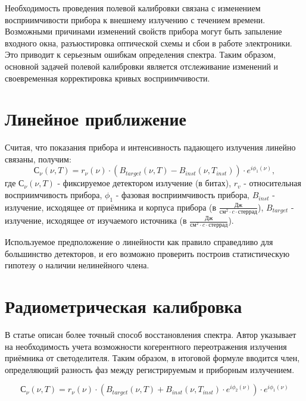 \documentclass{mipt-thesis-bs}
\begin{document}
 Необходимость проведения полевой калибровки связана с изменением восприимчивости прибора к внешнему излучению с течением времени. Возможными причинами изменений свойств прибора могут быть запыление входного окна, разъюстировка оптической схемы и сбои в работе электроники. Это приводит к серьезным ошибкам определения спектра. Таким образом, основной задачей полевой калибровки является отслеживание изменений и своевременная корректировка кривых восприимчивости.
	
	\section{Линейное приближение}
	
	Считая, что показания прибора и интенсивность падающего излучения линейно связаны, получим:
		\begin{equation}
С_\nu(\nu,T)=r_\nu(\nu)\cdot\left(B_{target}(\nu,T)-B_{inst}(\nu,T_{inst})\right) \cdot e^{i\phi_1(\nu)}, 	
	\end{equation}
где $С_\nu(\nu,T)$ - фиксируемое детектором излучение (в битах), $r_v$  - относительная восприимчивость прибора, $\phi_1$ - фазовая восприимчивость прибора, $B_{inst}$   - излучение, исходящее от приёмника и корпуса прибора (в $\frac{Дж}{см^2 \cdot c \cdot стеррад}$), $B_{target}$  - излучение, исходящее от изучаемого источника (в $\frac{Дж}{см^2 \cdot c \cdot стеррад}$). 

Используемое предположение о линейности как правило справедливо для большинство детекторов, и его возможно проверить построив статистическую гипотезу о наличии нелинейного члена.
	
	\section{Радиометрическая калибровка}
	
В статье \cite{revercomb1988radiometric} описан более точный способ восстановления спектра. Автор указывает на необходимость учета возможности когерентного переотражения излучения приёмника от светоделителя. Таким образом, в итоговой формуле вводится член, определяющий разность фаз между регистрируемым и приборным излучением.

\begin{equation}
	С_\nu(\nu,T)=r_\nu(\nu)\cdot\left(B_{target}(\nu,T)+B_{inst}(\nu,T_{inst})\cdot e^{i\phi_2(\nu)}\right) \cdot e^{i\phi_1(\nu)}
	\label{eqn_phaseterm}
\end{equation}
\end{document}

